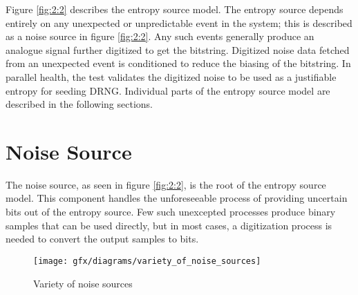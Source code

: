 Figure \ref{fig:2:2} describes the entropy source model. The entropy source depends entirely on any unexpected or unpredictable event in the system; this is described as a noise source in figure \ref{fig:2:2}. Any such events generally produce an analogue signal further digitized to get the bitstring. Digitized noise data fetched from an unexpected event is conditioned to reduce the biasing of the bitstring. In parallel health, the test validates the digitized noise to be used as a justifiable entropy for seeding DRNG. Individual parts of the entropy source model are described in the following sections.

%
%
\section{Noise Source}
\label{sec:fundamentals:noisesource}
The noise source, as seen in figure \ref{fig:2:2}, is the root of the entropy source model. This component handles the unforeseeable process of providing uncertain bits out of the entropy source. Few such unexcepted processes produce binary samples that can be used directly, but in most cases, a digitization process is needed to convert the output samples to bits.
\begin{figure}[!h]
	\centering
	\texttt{[image: gfx/diagrams/variety\_of\_noise\_sources]}
	\caption{Variety of noise sources}
	\label{fig:2:3}
\end{figure}

